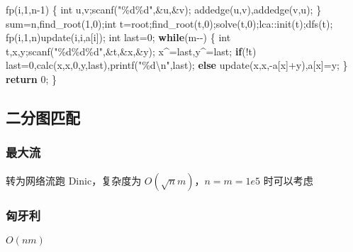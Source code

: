 \documentclass[
]{article}
\newenvironment{Shaded}{}{}
\newcommand{\ControlFlowTok}[1]{\textcolor[rgb]{0.00,0.44,0.13}{\textbf{#1}}}
\newcommand{\DataTypeTok}[1]{\textcolor[rgb]{0.56,0.13,0.00}{#1}}
\newcommand{\DecValTok}[1]{\textcolor[rgb]{0.25,0.63,0.44}{#1}}
\newcommand{\NormalTok}[1]{#1}
\newcommand{\SpecialCharTok}[1]{\textcolor[rgb]{0.25,0.44,0.63}{#1}}
\newcommand{\StringTok}[1]{\textcolor[rgb]{0.25,0.44,0.63}{#1}}
\begin{document}
\begin{Shaded}
\begin{Highlighting}[]
\NormalTok{    fp(i,}\DecValTok{1}\NormalTok{,n{-}}\DecValTok{1}\NormalTok{)}
\NormalTok{    \{}
        \DataTypeTok{int}\NormalTok{ u,v;scanf(}\StringTok{"}\SpecialCharTok{\%d\%d}\StringTok{"}\NormalTok{,\&u,\&v);}
\NormalTok{        addedge(u,v),addedge(v,u);}
\NormalTok{    \}}
\NormalTok{    sum=n,find\_root(}\DecValTok{1}\NormalTok{,}\DecValTok{0}\NormalTok{);}\DataTypeTok{int}\NormalTok{ t=root;find\_root(t,}\DecValTok{0}\NormalTok{);solve(t,}\DecValTok{0}\NormalTok{);lca::init(t);dfs(t);}
\NormalTok{    fp(i,}\DecValTok{1}\NormalTok{,n)update(i,i,a[i]);}
    \DataTypeTok{int}\NormalTok{ last=}\DecValTok{0}\NormalTok{;}
    \ControlFlowTok{while}\NormalTok{(m{-}{-})}
\NormalTok{    \{}
        \DataTypeTok{int}\NormalTok{ t,x,y;scanf(}\StringTok{"}\SpecialCharTok{\%d\%d\%d}\StringTok{"}\NormalTok{,\&t,\&x,\&y);}
\NormalTok{        x\^{}=last,y\^{}=last;}
        \ControlFlowTok{if}\NormalTok{(!t) last=}\DecValTok{0}\NormalTok{,calc(x,x,}\DecValTok{0}\NormalTok{,y,last),printf(}\StringTok{"}\SpecialCharTok{\%d\textbackslash{}n}\StringTok{"}\NormalTok{,last);}
        \ControlFlowTok{else}\NormalTok{ update(x,x,{-}a[x]+y),a[x]=y;}
\NormalTok{    \}}
    \ControlFlowTok{return} \DecValTok{0}\NormalTok{;}
\NormalTok{\}}
\end{Highlighting}
\end{Shaded}

\hypertarget{ux4e8cux5206ux56feux5339ux914d}{%
\subsection{二分图匹配}\label{ux4e8cux5206ux56feux5339ux914d}}

\hypertarget{ux6700ux5927ux6d41}{%
\subsubsection{最大流}\label{ux6700ux5927ux6d41}}

转为网络流跑 Dinic，复杂度为 \(O(\sqrt{n}m)\)，\(n=m=1e5\) 时可以考虑

\hypertarget{ux5308ux7259ux5229}{%
\subsubsection{匈牙利}\label{ux5308ux7259ux5229}}

\(O(nm)\)
\end{document}
